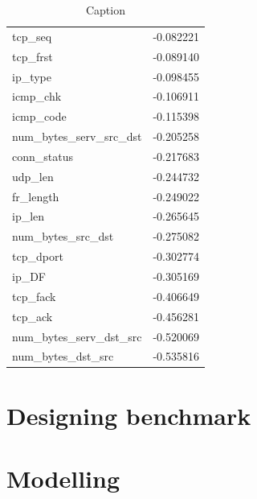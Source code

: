 \begin{table}[!htb]
\begin{tabular}{lr}
tcp\_seq&                 -0.082221\\
tcp\_frst&                -0.089140\\
ip\_type&                 -0.098455\\
icmp\_chk&                -0.106911\\
icmp\_code&               -0.115398\\
num\_bytes\_serv\_src\_dst&  -0.205258\\
conn\_status&             -0.217683\\
udp\_len&                 -0.244732\\
fr\_length&               -0.249022\\
ip\_len&                  -0.265645\\
num\_bytes\_src\_dst&       -0.275082\\
tcp\_dport&               -0.302774\\
ip\_DF&                   -0.305169\\
tcp\_fack&                -0.406649\\
tcp\_ack&                 -0.456281\\
num\_bytes\_serv\_dst\_src&  -0.520069\\
num\_bytes\_dst\_src&       -0.535816\\
\bottomrule
    \end{tabular}
    \caption{Caption}
    \label{tab:my_label}
\end{table}





\section{Designing benchmark}


\section{Modelling}
